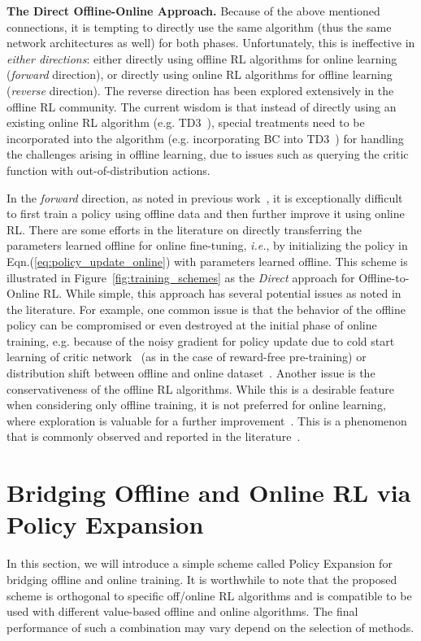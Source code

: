 \documentclass{article}
\begin{document}
{\flushleft \textbf{The Direct Offline-Online Approach.}}
Because of the above mentioned connections, it is tempting to directly use the same algorithm (thus the same network architectures as well)
for both phases.
Unfortunately, this is  ineffective in \emph{either directions}: either directly using offline RL algorithms for online learning (\emph{forward} direction), or directly using online RL algorithms for offline learning (\emph{reverse} direction).
The reverse direction has been explored extensively in the offline RL community.
The current wisdom is that instead of directly using an existing online  RL algorithm ({e.g.} TD3~\citep{TD3}),
special treatments need to be incorporated into the algorithm  ({e.g.} incorporating BC into TD3~\citep{td3bc}) for handling the challenges arising
in offline learning, due to issues such as querying the critic function with out-of-distribution actions.

In the \emph{forward} direction, as noted in previous work~\citep{AWAC}, it is exceptionally difficult to
first train a policy using offline data and then further improve it using online RL.
There are some efforts in the literature on directly transferring the parameters learned offline for online fine-tuning, \emph{i.e.},
by initializing the policy in Eqn.(\ref{eq:policy_update_online}) with parameters learned offline.
This scheme is illustrated in Figure~\ref{fig:training_schemes} as the \emph{Direct} approach for Offline-to-Online RL.
While simple, this approach has several potential issues as noted in the literature.
For example, one common issue is that the behavior of the offline policy can be compromised or even destroyed
at the initial phase of online training, {e.g.} because of the noisy gradient for policy update due to
cold start learning of critic network~\citep{jump_start_RL} (as in the case of reward-free pre-training)
or distribution shift between offline and online dataset~\citep{balanced_replay}.
Another issue is the conservativeness of the offline RL algorithms. While this is a desirable feature
when considering only offline training,  it is not preferred for online learning,
where exploration is valuable for a further improvement~\citep{anti_exploration}.
This is a phenomenon that is commonly observed and reported in the literature~\citep{balanced_replay, behavior_transfer, jump_start_RL}.





\vspace{-0.1in}
\section{Bridging Offline and Online RL via Policy Expansion}
\vspace{-0.1in}
In this section, we will introduce a simple scheme called Policy Expansion for bridging offline and online training.
It is worthwhile to note that the proposed scheme is orthogonal to specific off/online RL algorithms and is
compatible to be used with different value-based offline and online algorithms. The final performance of such a combination may vary depend on the selection of methods.
\end{document}
